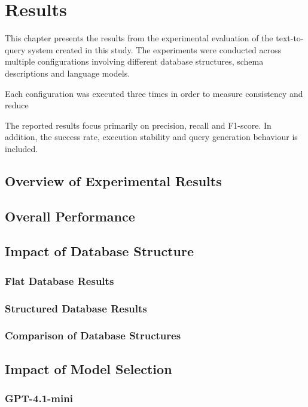 \chapter{Results} \label{ch:results}

This chapter presents the results from the experimental evaluation of the text-to-query system created in this study. The experiments were conducted across multiple configurations involving different database structures, schema descriptions and language models. 

Each configuration was executed three times in order to measure consistency and reduce 

The reported results focus primarily on precision, recall and F1-score. In addition, the success rate, execution stability and query generation behaviour is included. 

\section{Overview of Experimental Results}

\section{Overall Performance}



\section{Impact of Database Structure}
    \subsection{Flat Database Results}
    \subsection{Structured Database Results}
    \subsection{Comparison of Database Structures}

\section{Impact of Model Selection}
    \subsection{GPT-4.1-mini}
